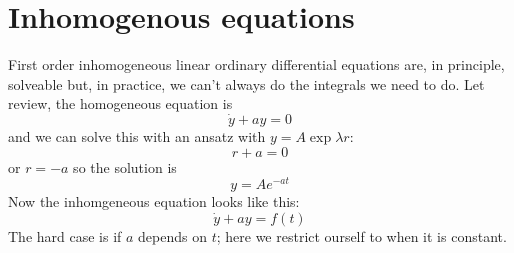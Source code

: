 \documentclass[12pt]{article}
\begin{document}
\section*{Inhomogenous equations}

First order inhomogeneous linear ordinary differential equations are, in principle, solveable but, in practice, we can't always do the integrals we need to do. Let review, the homogeneous equation is
\begin{equation}
  \dot{y}+ay=0
\end{equation}
and we can solve this with an ansatz with $y=A\exp{\lambda r}$:
\begin{equation}
  r+a=0
\end{equation}
or $r=-a$ so the solution is
\begin{equation}
  y=Ae^{-at}
\end{equation}
Now the inhomgeneous equation looks like this:
\begin{equation}
  \dot{y}+ay=f(t)
\end{equation}
The hard case is if $a$ depends on $t$; here we restrict ourself to when it is constant.
\end{document}
